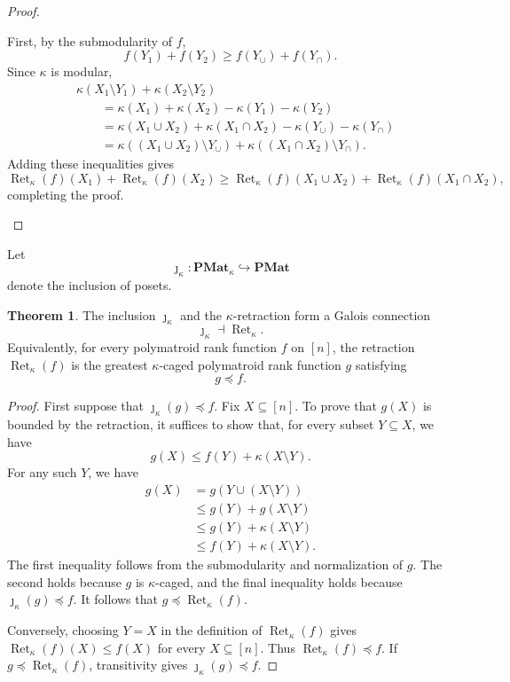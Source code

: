 \documentclass[11pt]{article}
\theoremstyle{definition}
\newtheorem{theorem}{Theorem}[section]
\theoremstyle{remark}
\newcommand{\PMat}{\mathbf{PMat}}      %
\newcommand{\PMatK}{\mathbf{PMat}_\kappa}
\DeclareMathOperator{\Ret}{Ret}                %
\newcommand{\RetK}{\Ret_{\kappa}}              %
\begin{document}
\begin{proof}
\begin{itemize}
        First, by the submodularity of $f$,
        \[
            f(Y_1)+f(Y_2)
            \geq
            f(Y_{\cup})+f(Y_{\cap}).
        \]
        Since $\kappa$ is modular,
        \begin{align*}
            &\kappa(X_1\setminus Y_1)+\kappa(X_2\setminus Y_2)\\
            &\qquad=
            \kappa(X_1)+\kappa(X_2)-\kappa(Y_1)-\kappa(Y_2)\\
            &\qquad=
            \kappa(X_1\cup X_2)+\kappa(X_1\cap X_2)
            -\kappa(Y_\cup)-\kappa(Y_\cap)\\
            &\qquad=
            \kappa((X_1\cup X_2)\setminus Y_\cup)
            +
            \kappa((X_1\cap X_2)\setminus Y_\cap).
        \end{align*}
        Adding these inequalities gives
        \[
            \RetK(f)(X_1)+\RetK(f)(X_2)
            \geq
            \RetK(f)(X_1\cup X_2)+\RetK(f)(X_1\cap X_2),
        \]
        completing the proof.
    \end{itemize}
\end{proof}

Let
\[
    \jmath_\kappa\colon\PMatK\hookrightarrow\PMat
\]
denote the inclusion of posets.

\begin{theorem}\label{thm:rank_retraction_galois}
    The inclusion $\jmath_\kappa$ and the $\kappa$-retraction form a Galois
    connection
    \[
        \jmath_\kappa\dashv\RetK.
    \]
    Equivalently, for every polymatroid rank function $f$ on $[n]$, the
    retraction $\RetK(f)$ is the greatest $\kappa$-caged polymatroid rank
    function $g$ satisfying
    \[
        g\preceq f.
    \]
\end{theorem}

\begin{proof}
    First suppose that $\jmath_\kappa(g)\preceq f$. Fix
    $X\subseteq[n]$. To prove that $g(X)$ is bounded by the retraction, it
    suffices to show that, for every subset $Y\subseteq X$, we have
    \[
        g(X)\leq f(Y)+\kappa(X\setminus Y).
    \]
    For any such $Y$, we have
    \begin{align*}
        g(X)
        &=g(Y\cup(X\setminus Y))\\
        &\leq g(Y)+g(X\setminus Y)\\
        &\leq g(Y)+\kappa(X\setminus Y)\\
        &\leq f(Y)+\kappa(X\setminus Y).
    \end{align*}
    The first inequality follows from the submodularity and normalization
    of $g$. The second holds because $g$ is $\kappa$-caged, and the final
    inequality holds because $\jmath_\kappa(g)\preceq f$. It follows that
    $g\preceq\RetK(f)$.

    Conversely, choosing $Y=X$ in the definition of $\RetK(f)$ gives
    $\RetK(f)(X)\leq f(X)$ for every $X\subseteq[n]$. Thus
    $\RetK(f)\preceq f$. If $g\preceq\RetK(f)$, transitivity gives
    $\jmath_\kappa(g)\preceq f$.
\end{proof}
\end{document}
